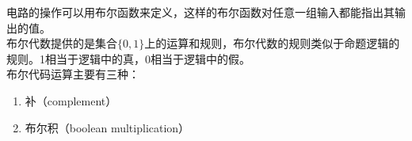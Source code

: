 \documentclass[12pt, openany, oneside]{book}
\begin{document}
电路的操作可以用布尔函数来定义，这样的布尔函数对任意一组输入都能指出其输出的值。 \\

布尔代数提供的是集合$ \{0, 1\} $上的运算和规则，布尔代数的规则类似于命题逻辑的规则。1相当于逻辑中的真，0相当于逻辑中的假。 \\

布尔代码运算主要有三种：

\begin{enumerate}
	\item 补（complement）
	      \begin{table}[H]
		      \centering
	      \end{table}

	\item 布尔积（boolean multiplication）
	      \begin{table}[H]
		      \centering
	      \end{table}


\end{enumerate}
\end{document}
